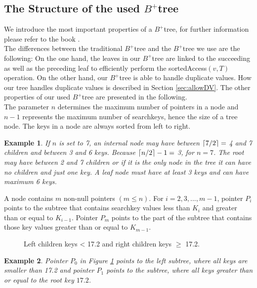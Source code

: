 \documentclass[abstracton,12pt,oneside]{scrreprt}
\DeclarePairedDelimiter\ceil{\lceil}{\rceil}
\newtheorem{example}{Example}
\begin{document}
\subsection{The Structure of the used $B^+$tree}
\label{structureBtree}
We introduce the most important properties of a $B^+$tree, for further information please refer to the book \cite{DatabaseSystemC}.\\
The differences between the traditional $B^+$tree and the $B^+$tree we use are the following: On the one hand, the leaves in our $B^+$tree are linked to the succeeding as well as the preceding leaf to efficiently perform the sortedAccess$(v,T)$ operation. On the other hand, our $B^+$tree is able to handle duplicate values. How our tree handles duplicate values is described in Section \ref{sec:allowDV}. The other properties of our used $B^+$tree are presented in the following.\\
The parameter $n$ determines the maximum number of pointers in a node and $n-1$ represents the maximum number of searchkeys, hence the size of a tree node. The keys in a node are always sorted from left to right. 
\begin{example}
	If $n$ is set to 7, an internal node may have between $\ceil{7/2} =$ 4 and 7 children and between 3 and 6 keys. Because $\ceil{n/2}-1 =$ 3, for $n=7$. The root may have between 2 and 7 children or if it is the only node in the tree it can have no children and just one key. A leaf node must have at least 3 keys and can have maximum 6 keys.
\end{example}
A node contains $m$ non-null pointers $\left(m \leq n\right)$. For $i = 2, 3, . . . ,m-1$, pointer $P_i$ points to the subtree that contains searchkey values less than $K_i$ and greater than or equal to $K_{i-1}$. Pointer $P_m$ points to the part of the subtree that contains those key values greater than or equal to $K_{m-1}$. 

\begin{figure}[H]
	\centering
	\vspace{2mm}
	\caption{Left children keys < 17.2 and right children keys $\geq$ 17.2.}
	\label{fig:little}
\end{figure} 
\begin{example}
	Pointer $P_0$ in Figure \ref{fig:little} points to the left subtree, where all keys are smaller than 17.2 and pointer $P_1$ points to the subtree, where all keys greater than or equal to the root key $17.2$.
\end{example}
\end{document}
